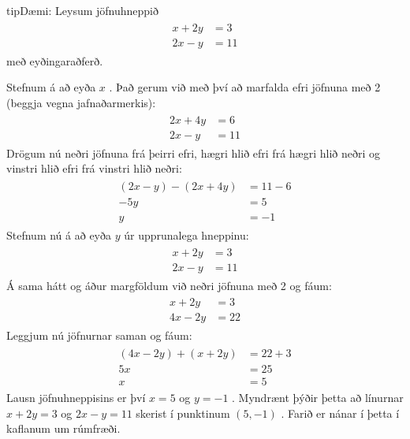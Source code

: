 \documentclass[a4paper,10pt,icelandic]{sphinxmanual}
\begin{document}
\begin{sphinxadmonition}{tip}{Dæmi:}
Leysum jöfnuhneppið
\begin{equation*}
\begin{split}\begin{aligned}
  x+2y&=3 \\
  2x-y &=11
\end{aligned}\end{split}
\end{equation*}
með eyðingaraðferð.


Stefnum á að eyða \(x\) . Það gerum við með því að marfalda efri jöfnuna með 2 (beggja vegna jafnaðarmerkis):
\begin{equation*}
\begin{split}\begin{aligned}
  2x+4y&=6 \\
  2x-y &=11
\end{aligned}\end{split}
\end{equation*}
Drögum nú neðri jöfnuna frá þeirri efri, hægri hlið efri frá hægri hlið neðri og vinstri hlið efri frá vinstri hlið neðri:
\begin{equation*}
\begin{split}\begin{aligned}
  (2x-y)-(2x+4y) &=11-6 \\
  -5y &= 5 \\
  y&=-1
\end{aligned}\end{split}
\end{equation*}
Stefnum nú á að eyða \(y\) úr upprunalega hneppinu:
\begin{equation*}
\begin{split}\begin{aligned}
  x+2y&=3 \\
  2x-y &=11
\end{aligned}\end{split}
\end{equation*}
Á sama hátt og áður margföldum við neðri jöfnuna með 2 og fáum:
\begin{equation*}
\begin{split}\begin{aligned}
  x+2y&=3 \\
  4x-2y &=22
\end{aligned}\end{split}
\end{equation*}
Leggjum nú jöfnurnar saman og fáum:
\begin{equation*}
\begin{split}\begin{aligned}
  (4x-2y )+ (x+2y) &=22 +3 \\
  5x &= 25 \\
  x&=5
\end{aligned}\end{split}
\end{equation*}
Lausn jöfnuhneppisins er því \(x=5\) og \(y=-1\) .
Myndrænt þýðir þetta að línurnar \(x+2y=3\) og \(2x-y =11\) skerist í punktinum \((5,-1)\) .
Farið er nánar í þetta í kaflanum um rúmfræði.
\end{sphinxadmonition}
\end{document}
